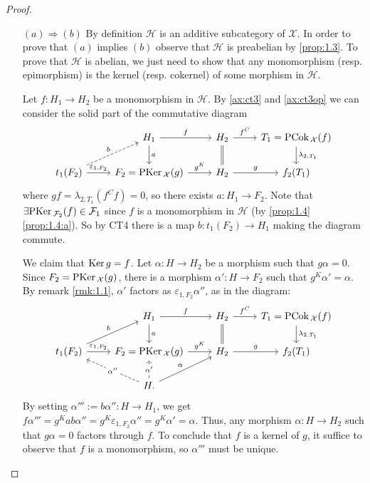 \begin{proof} ~


  \begin{enumerate}
    \item[$(a)\Rightarrow (b)$]
      By definition $\mathcal{H}$ is an additive subcategory of $\mathcal{X}$. In order to prove
      that $(a)$ implies $(b)$  observe that
      $\mathcal{H}$ is preabelian by \cref{prop:1.3}. To prove that $\mathcal{H}$ is abelian, we
      just need to show that any monomorphism (resp. epimorphism) is the kernel (resp. cokernel) of some
      morphism in $\mathcal{H}$.

      Let $f:H_1\to H_2$ be a monomorphism in $\mathcal{H}$. By \ref{ax:ct3} and \ref{ax:ct3op} we can
      consider the solid part of the commutative diagram
      \begin{equation*}
        \begin{tikzcd}
          & H_1\arrow{r}{f}\arrow{d}{a}
            & H_2\arrow{r}{f^C}\arrow[equal]{d}
              & T_1 = \PCok_\mathcal{X}(f)\arrow{d}{\lambda_{2,T_1}}\\
          t_1(F_2)\arrow[dashed]{ur}{b}\arrow{r}{\varepsilon_{1,F_2}}
          & F_2=\PKer_\mathcal{X}(g)\arrow{r}{g^K}
            & H_2\arrow{r}{g}
              & f_2(T_1)
        \end{tikzcd}
      \end{equation*}
      where $gf = \lambda_{2,T_1}(f^C f)=0$, so there exists $a:H_1\to F_2$. Note that $\exists \mathrm{\textup{PKer\,}}_{\mathcal{F}_2}(f)\in\mathcal{F}_1$
      since $f$ is a monomorphism in $\mathcal{H}$ (by \cref{prop:1.4}\ref{prop:1.4:a}). So
      by CT4  there is a map $b:t_1(F_2)\to H_1$ making the diagram commute.

      We claim that $\mathrm{\textup{Ker\,}} g = f$. Let $\alpha:H\to H_2$ be a morphism such that $g\alpha =0$. Since
      $F_2 = \mathrm{\textup{PKer\,}}_\mathcal{X}(g)$, there is a morphism $\alpha':H\to F_2$ such that $g^K\alpha'=\alpha$.
      By remark \ref{rmk:1.1}, $\alpha'$ factors as $\varepsilon_{1,F_2}\alpha''$, as in the diagram:
      \begin{equation*}
        \begin{tikzcd}
          & H_1\arrow{r}{f}\arrow{d}{a}
            & H_2\arrow{r}{f^C}\arrow[equal]{d}
              & T_1 = \PCok_\mathcal{X}(f)\arrow{d}{\lambda_{2,T_1}}\\
          t_1(F_2)\arrow{ur}{b}\arrow{r}{\varepsilon_{1,F_2}}
          & F_2=\PKer_\mathcal{X}(g)\arrow{r}{g^K}
            & H_2\arrow{r}{g}
              & f_2(T_1)\\
          & H.\arrow{ur}{\alpha}\arrow[dashed]{u}[description]{\alpha'}\arrow[dashed]{ul}[description]{\alpha''}
            & &
        \end{tikzcd}
      \end{equation*}
      By setting $\alpha''' := b\alpha'':H\to H_1$, we get
      $f\alpha''' = g^K ab\alpha'' = g^K\varepsilon_{1,F_2}\alpha''=g^K\alpha' = \alpha$. Thus,
      any morphism $\alpha:H \to H_2$ such that $g\alpha =0$ factors through $f$. To conclude that $f$ is
      a kernel of $g$, it suffice to observe that $f$ is a monomorphism, so $\alpha'''$ must be unique.


\end{enumerate}
\end{proof}
